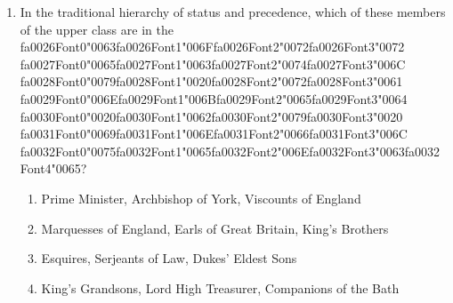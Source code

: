 \documentclass[12pt]{article}
\begin{document}
\begin{enumerate}[label=\arabic*.]
\begin{enumerate}[label=(\alph*)]
    \item the group of structural theories of society that he was reacting against
    \item the overall impression of ourselves that we try to give off to others
    \item a significant figure in early childhood who teaches us the general values of society
    \item an image of how people in the wider society might perceive our behaviour
\end{enumerate}
\item In the traditional hierarchy of status and precedence, which of these members of the upper class are in the {\csname fa0026Font0\endcsname\char"0063}{\csname fa0026Font1\endcsname\char"006F}{\csname fa0026Font2\endcsname\char"0072}{\csname fa0026Font3\endcsname\char"0072} {\csname fa0027Font0\endcsname\char"0065}{\csname fa0027Font1\endcsname\char"0063}{\csname fa0027Font2\endcsname\char"0074}{\csname fa0027Font3\endcsname\char"006C} {\csname fa0028Font0\endcsname\char"0079}{\csname fa0028Font1\endcsname\char"0020}{\csname fa0028Font2\endcsname\char"0072}{\csname fa0028Font3\endcsname\char"0061} {\csname fa0029Font0\endcsname\char"006E}{\csname fa0029Font1\endcsname\char"006B}{\csname fa0029Font2\endcsname\char"0065}{\csname fa0029Font3\endcsname\char"0064} {\csname fa0030Font0\endcsname\char"0020}{\csname fa0030Font1\endcsname\char"0062}{\csname fa0030Font2\endcsname\char"0079}{\csname fa0030Font3\endcsname\char"0020} {\csname fa0031Font0\endcsname\char"0069}{\csname fa0031Font1\endcsname\char"006E}{\csname fa0031Font2\endcsname\char"0066}{\csname fa0031Font3\endcsname\char"006C} {\csname fa0032Font0\endcsname\char"0075}{\csname fa0032Font1\endcsname\char"0065}{\csname fa0032Font2\endcsname\char"006E}{\csname fa0032Font3\endcsname\char"0063}{\csname fa0032Font4\endcsname\char"0065}?
\begin{enumerate}[label=(\alph*)]
    \item Prime Minister, Archbishop of York, Viscounts of England
    \item Marquesses of England, Earls of Great Britain, King's Brothers
    \item Esquires, Serjeants of Law, Dukes' Eldest Sons
    \item King's Grandsons, Lord High Treasurer, Companions of the Bath
\end{enumerate}

\end{enumerate}
\end{document}
